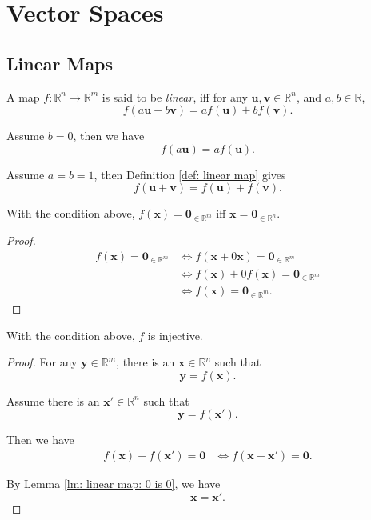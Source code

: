 
\chapter{Vector Spaces}


\section{Linear Maps}



\begin{definition}
	\label{def: linear map}	
	A map $f: \mathbb R^n \to \mathbb R^m$ is said to be \textit{linear}, iff for any $\mathbf u, \mathbf v \in \mathbb R^n$, and $a, b \in \mathbb R$,
	$$
	f(a\mathbf u + b\mathbf v) = a f(\mathbf u) + b f(\mathbf v).
	$$
\end{definition}


\begin{note}
	Assume $b = 0$, then we have
	$$
	f(a\mathbf u) = a f(\mathbf u).
	$$

	Assume $a = b = 1$, then Definition \ref{def: linear map} gives
	$$
	f(\mathbf u + \mathbf v) = f(\mathbf u) + f(\mathbf v).
	$$	
\end{note}


\begin{lemma}
	\label{lm: linear map: 0 is 0}
	With the condition above, $f(\mathbf x) = \mathbf 0_{\in \mathbb R^m}$ iff $\mathbf x = \mathbf 0_{\in \mathbb R^n}$.
	\begin{proof}
		$$
		\begin{aligned}
			f(\mathbf x) = \mathbf 0_{\in \mathbb R^m}
			&\iff f(\mathbf x + 0\mathbf x) = \mathbf 0_{\in \mathbb R^m} \\
			&\iff f(\mathbf x) + 0 f(\mathbf x) = \mathbf 0_{\in \mathbb R^m} \\
			&\iff f(\mathbf x) = \mathbf 0_{\in \mathbb R^m}. 
		\end{aligned}
		$$
	\end{proof}
\end{lemma}


\begin{lemma}
	\label{lm: linear map: is injective}
	With the condition above, $f$ is injective.
	\begin{proof}
		For any $\mathbf y \in \mathbb R^m$, there is an $\mathbf x \in \mathbb R^n$ such that
		$$
		\mathbf y = f(\mathbf x).
		$$
		
		Assume there is an $\mathbf x' \in \mathbb R^n$ such that
		$$
		\mathbf y = f(\mathbf x').
		$$
		
		Then we have
		$$
		\begin{aligned}
			f(\mathbf x) - f(\mathbf x') = \mathbf 0
			&\iff f(\mathbf x - \mathbf x') = \mathbf 0.
		\end{aligned}
		$$
		
		By Lemma \ref{lm: linear map: 0 is 0}, we have
		$$
		\mathbf x = \mathbf x'.
		$$
	\end{proof}
\end{lemma}


